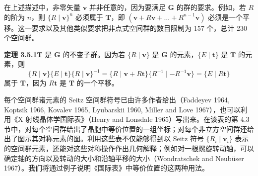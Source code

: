 在上述描述中，非零矢量 $\mathbf{v}$ 并非任意的，因为要满足 $\mathbf{G}$ 的群的要求。例如，若 $R$ 的阶为 $n$，则 $\{R \mid \mathbf{v}\}^{n}$ 必须属于 $\mathbf{T}$，即 $(\mathbf{v} + R\mathbf{v} + \dots + R^{n-1}\mathbf{v})$ 必须是一个平移。这一要求以及其他类似要求把非点式空间群的数目限制为 157 个，总计 230 个空间群。

\noindent\textbf{定理 3.5.1}\quad $\mathbf{T}$ 是 $\mathbf{G}$ 的不变子群。因为若 $\{R \mid \mathbf{v}\}$ 是 $\mathbf{G}$ 的元素，$\{E \mid \mathbf{t}\}$ 是 $\mathbf{T}$ 的元素，则
\begin{equation*}
\{R \mid \mathbf{v}\}\{E \mid \mathbf{t}\}\{R \mid \mathbf{v}\}^{-1} = \{R \mid \mathbf{v} + R\mathbf{t}\}\{R^{-1} \mid -R^{-1}\mathbf{v}\} = \{E \mid R\mathbf{t}\}
\tag{3.5.3}
\end{equation*}
属于 $\mathbf{T}$，因为 $R\mathbf{t}$ 是 $\mathbf{T}$ 的一个平移。

每个空间群诸元素的 Seitz 空间群符号已由许多作者给出（Faddeyev 1964, Koptsik 1966, Kovalev 1965, Lyubarskii 1960, Miller and Love 1967），也可以利用《X 射线晶体学国际表》（Henry and Lonsdale 1965）写出来。在该表的第 4.3 节中，对每个空间群给出了晶胞中等价位置的一组坐标；对每个非立方空间群还给出了图示其对称元素的图。利用这些表不仅能够得到以 Seitz 符号 $\{R_{i} \mid \mathbf{v}_{i}\}$ 表示的空间群元素，还能对这些对称操作作出几何解释；例如对一根螺旋转动轴，可以确定轴的方向以及转动的大小和沿轴平移的大小（Wondratschek and Neubüser 1967）。我们将通过例子说明《国际表》中等价位置的这两种用法。

